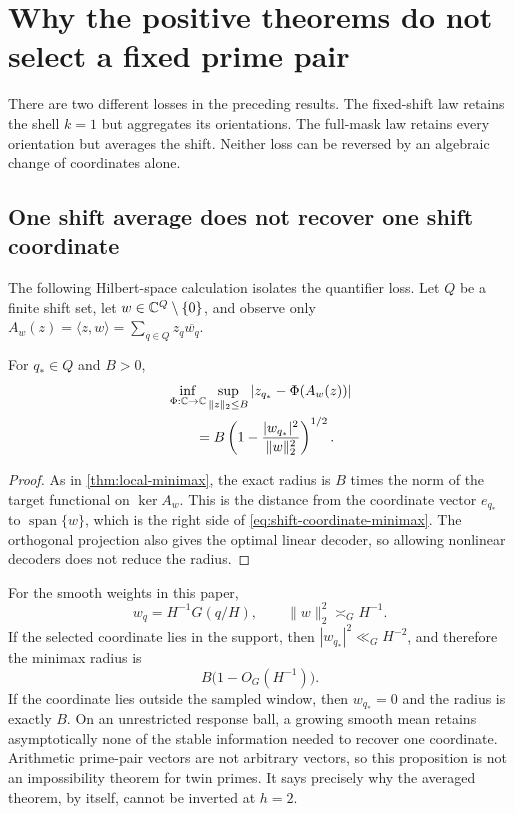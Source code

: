 \section{Why the positive theorems do not select a fixed prime pair}
\label{sec:fixed-shift-boundary}

There are two different losses in the preceding results.  The fixed-shift
law retains the shell $k=1$ but aggregates its orientations.  The full-mask
law retains every orientation but averages the shift.  Neither loss can be
reversed by an algebraic change of coordinates alone.

\subsection{One shift average does not recover one shift coordinate}

The following Hilbert-space calculation isolates the quantifier loss.
Let $Q$ be a finite shift set, let $w\in\mathbb C^Q\setminus\{0\}$, and observe
only
$A_w(z)=\langle z,w\rangle=\sum_{q\in Q}z_q\overline{w_q}$.

\begin{proposition}
\label{prop:shift-coordinate-minimax}
For $q_\ast\in Q$ and $B>0$,
\begin{align}
 &\inf_{\Phi:\mathbb C\to\mathbb C}
 \sup_{\|z\|_2\leq B}
 |z_{q_\ast}-\Phi(A_w(z))|
 \notag\\
 &\qquad={}
 B\left(
 1-\frac{|w_{q_\ast}|^2}{\|w\|_2^2}
 \right)^{1/2}.
 \label{eq:shift-coordinate-minimax}
\end{align}
\end{proposition}

\begin{proof}
As in \cref{thm:local-minimax}, the exact radius is $B$ times the norm of
the target functional on $\ker A_w$.  This is the distance from the
coordinate vector $e_{q_\ast}$ to $\operatorname{span}\{w\}$, which is
the right side of \eqref{eq:shift-coordinate-minimax}.  The orthogonal
projection also gives the optimal linear decoder, so allowing nonlinear
decoders does not reduce the radius.
\end{proof}

For the smooth weights in this paper,
\begin{equation}
 w_q=H^{-1}G(q/H),
 \qquad
 \|w\|_2^2\asymp_G H^{-1}.
 \label{eq:smooth-shift-vector}
\end{equation}
If the selected coordinate lies in the support, then
$|w_{q_\ast}|^2\ll_GH^{-2}$, and therefore the minimax radius is
\begin{equation}
 B\bigl(1-O_G(H^{-1})\bigr).
 \label{eq:smooth-shift-minimax-limit}
\end{equation}
If the coordinate lies outside the sampled window, then $w_{q_\ast}=0$
and the radius is exactly $B$.
On an unrestricted response ball, a growing smooth mean retains
asymptotically none of the stable information needed to recover one
coordinate.  Arithmetic prime-pair vectors are not arbitrary vectors, so
this proposition is not an impossibility theorem for twin primes.  It says
precisely why the averaged theorem, by itself, cannot be inverted at
$h=2$.

